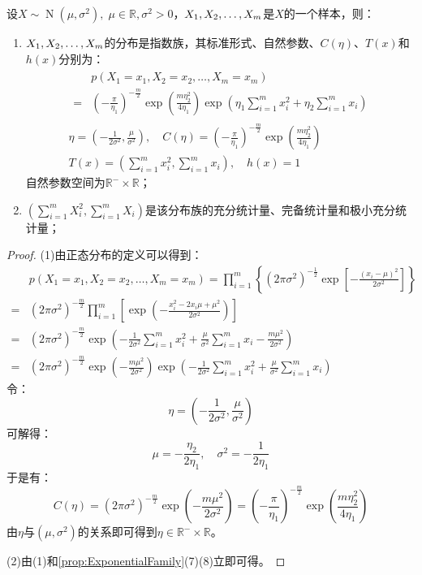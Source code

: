 \begin{theorem}
	设$X\sim\operatorname{N}(\mu,\sigma^2),\;\mu\in\mathbb{R},\sigma^2>0$，$X_1, X_2, \dots, X_{m}$是$X$的一个样本，则：
	\begin{enumerate}
		\item $X_1, X_2, \dots, X_{m}$的分布是指数族，其标准形式、自然参数、$C(\eta)$、$T(x)$和$h(x)$分别为：
		\begin{gather*}
			\begin{aligned}
				&p(X_1=x_1,X_2=x_2,\dots,X_m=x_m) \\
				=&\left(-\frac{\pi}{\eta_1}\right)^{-\frac{m}{2}}\exp\left(\frac{m\eta_2^2}{4\eta_1}\right)\exp\left(\eta_1\sum_{i=1}^{m}x_i^2+\eta_2\sum_{i=1}^{m}x_i\right)
			\end{aligned} \\
			\eta=\left(-\frac{1}{2\sigma^2},\frac{\mu}{\sigma^2}\right),\quad C(\eta)=\left(-\frac{\pi}{\eta_1}\right)^{-\frac{m}{2}}\exp\left(\frac{m\eta_2^2}{4\eta_1}\right) \\
			T(x)=\left(\sum_{i=1}^{m}x_i^2,\sum_{i=1}^{m}x_i\right),\quad h(x)=1
		\end{gather*}
		自然参数空间为$\mathbb{R}^-\times\mathbb{R}$；
		\item $\left(\sum\limits_{i=1}^{m}X_i^2,\sum\limits_{i=1}^{m}X_i\right)$是该分布族的充分统计量、完备统计量和极小充分统计量；
	\end{enumerate}
\end{theorem}
\begin{proof}
	(1)由正态分布的定义可以得到：
	\begin{align*}
		&p(X_1=x_1,X_2=x_2,\dots,X_m=x_m)=\prod_{i=1}^{m}\left\{(2\pi\sigma^2)^{-\frac{1}{2}}\exp\left[-\frac{(x_i-\mu)^2}{2\sigma^2}\right]\right\} \\
		=&(2\pi\sigma^2)^{-\frac{m}{2}}\prod_{i=1}^{m}\left[\exp\left(-\frac{x_i^2-2x_i\mu+\mu^2}{2\sigma^2}\right)\right] \\
		=&(2\pi\sigma^2)^{-\frac{m}{2}}\exp\left(-\frac{1}{2\sigma^2}\sum_{i=1}^{m}x_i^2+\frac{\mu}{\sigma^2}\sum_{i=1}^{m}x_i-\frac{m\mu^2}{2\sigma^2}\right) \\
		=&(2\pi\sigma^2)^{-\frac{m}{2}}\exp\left(-\frac{m\mu^2}{2\sigma^2}\right)\exp\left(-\frac{1}{2\sigma^2}\sum_{i=1}^{m}x_i^2+\frac{\mu}{\sigma^2}\sum_{i=1}^{m}x_i\right)
	\end{align*}
	令：
	\begin{equation*}
		\eta=\left(-\frac{1}{2\sigma^2},\frac{\mu}{\sigma^2}\right)
	\end{equation*}
	可解得：
	\begin{equation*}
		\mu=-\frac{\eta_2}{2\eta_1},\quad\sigma^2=-\frac{1}{2\eta_1}
	\end{equation*}
	于是有：
	\begin{equation*}
		C(\eta)=(2\pi\sigma^2)^{-\frac{m}{2}}\exp\left(-\frac{m\mu^2}{2\sigma^2}\right)=\left(-\frac{\pi}{\eta_1}\right)^{-\frac{m}{2}}\exp\left(\frac{m\eta_2^2}{4\eta_1}\right)
	\end{equation*}
	由$\eta$与$(\mu,\sigma^2)$的关系即可得到$\eta\in\mathbb{R}^{-}\times\mathbb{R}$。\par
	(2)由(1)和\cref{prop:ExponentialFamily}(7)(8)立即可得。
\end{proof}

